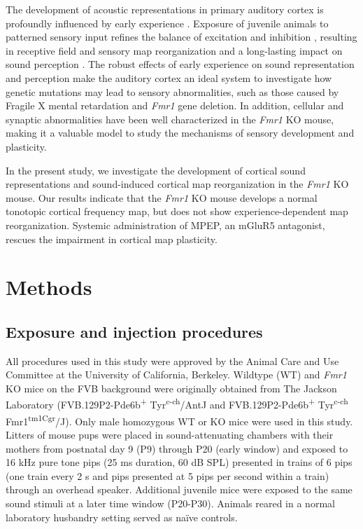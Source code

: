 The development of acoustic representations in primary auditory cortex is profoundly influenced by early experience \cite{Zhang2001, DeVillers-Sidani2007, Insanally2009, Popescu2010a}. Exposure of juvenile animals to patterned sensory input refines the balance of excitation and inhibition \cite{Dorrn2010, Sun2010}, resulting in receptive field and sensory map reorganization and a long-lasting impact on sound perception \cite{Han2007}. The robust effects of early experience on sound representation and perception make the auditory cortex an ideal system to investigate how genetic mutations may lead to sensory abnormalities, such as those caused by Fragile X mental retardation and \textit{Fmr1} gene deletion. In addition, cellular and synaptic abnormalities have been well characterized in the \textit{Fmr1} KO mouse, making it a valuable model to study the mechanisms of sensory development and plasticity.

In the present study, we investigate the development of cortical sound representations and sound-induced cortical map reorganization in the \textit{Fmr1} KO mouse. Our results indicate that the \textit{Fmr1} KO mouse develops a normal tonotopic cortical frequency map, but does not show experience-dependent map reorganization. Systemic administration of MPEP, an mGluR5 antagonist, rescues the impairment in cortical map plasticity.

\section{Methods}

\subsection{Exposure and injection procedures}

All procedures used in this study were approved by the Animal Care and Use Committee at the University of California, Berkeley. Wildtype (WT) and \textit{Fmr1} KO mice on the FVB background were originally obtained from The Jackson Laboratory (FVB.129P2-Pde6b\textsuperscript{+} Tyr\textsuperscript{c-ch}/AntJ and FVB.129P2-Pde6b\textsuperscript{+} Tyr\textsuperscript{c-ch} Fmr1\textsuperscript{tm1Cgr}/J). Only male homozygous WT or KO mice were used in this study. Litters of mouse pups were placed in sound-attenuating chambers with their mothers from postnatal day 9 (P9) through P20 (early window) and exposed to 16 kHz pure tone pips (25 ms duration, 60 dB SPL) presented in trains of 6 pips (one train every 2 s and pips presented at 5 pips per second within a train) through an overhead speaker. Additional juvenile mice were exposed to the same sound stimuli at a later time window (P20-P30). Animals reared in a normal laboratory husbandry setting served as na\"ive controls.

